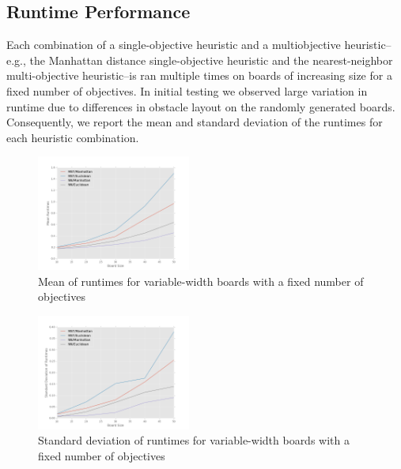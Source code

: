 \documentclass[12pt, conference, compsocconf]{IEEEtran}
\begin{document}
\subsection{Runtime Performance}
Each combination of a single-objective heuristic and a multiobjective heuristic--e.g., the Manhattan distance single-objective heuristic and the nearest-neighbor multi-objective heuristic--is ran multiple times on boards of increasing size for a fixed number of objectives.
In initial testing we observed large variation in runtime due to differences in obstacle layout on the randomly generated boards. 
Consequently, we report the mean and standard deviation of the runtimes for each heuristic combination. 

\begin{figure}[h!]
    \centering
    \includegraphics[width=0.45\textwidth]{runtimes.png}
    \caption{Mean of runtimes for variable-width boards with a fixed number of objectives}
    \label{runtimes-fig}
\end{figure}

\begin{figure}[h!]
    \centering
    \includegraphics[width=0.45\textwidth]{variability.png}
    \caption{Standard deviation of runtimes for variable-width boards with a fixed number of objectives}
    \label{variability-fig}
\end{figure}
\end{document}
